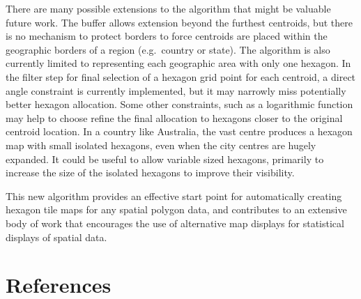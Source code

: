 There are many possible extensions to the algorithm that might be valuable future work. The buffer allows extension beyond the furthest centroids, but there is no mechanism to protect borders to force centroids are placed within the geographic borders of a region (e.g.~country or state). The algorithm is also currently limited to representing each geographic area with only one hexagon. In the filter step for final selection of a hexagon grid point for each centroid, a direct angle constraint is currently implemented, but it may narrowly miss potentially better hexagon allocation. Some other constraints, such as a logarithmic function may help to choose refine the final allocation to hexagons closer to the original centroid location. In a country like Australia, the vast centre produces a hexagon map with small isolated hexagons, even when the city centres are hugely expanded. It could be useful to allow variable sized hexagons, primarily to increase the size of the isolated hexagons to improve their visibility.

This new algorithm provides an effective start point for automatically creating hexagon tile maps for any spatial polygon data, and contributes to an extensive body of work that encourages the use of alternative map displays for statistical displays of spatial data.

\hypertarget{references}{%
\section*{References}\label{references}}

